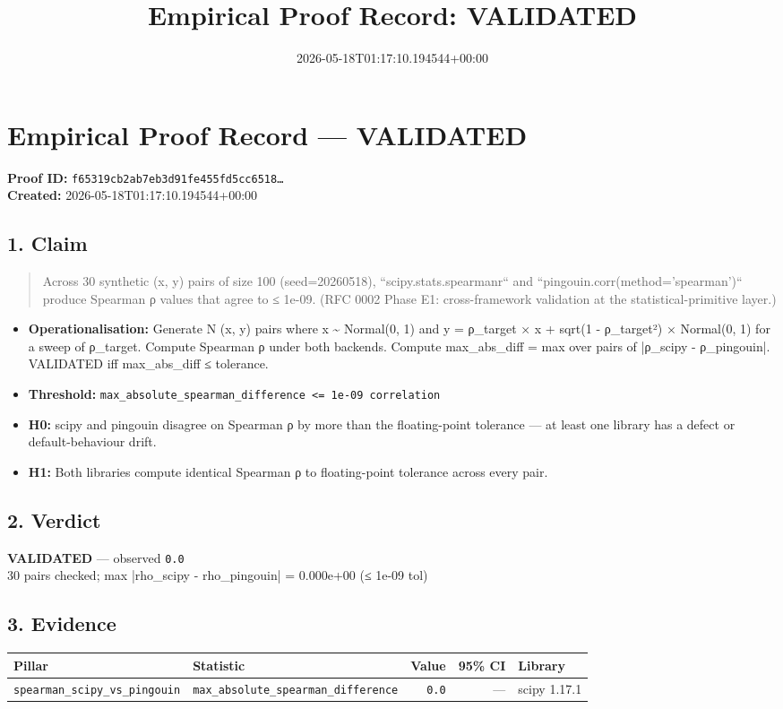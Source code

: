 \documentclass{article}
\title{Empirical Proof Record: VALIDATED}
\date{2026-05-18T01:17:10.194544+00:00}
\begin{document}
\maketitle
\section*{Empirical Proof Record --- \textcolor{validated}{\textbf{VALIDATED}}}
\textbf{Proof ID:} \texttt{f65319cb2ab7eb3d91fe455fd5cc6518\dots}\\
\textbf{Created:} 2026-05-18T01:17:10.194544+00:00
\subsection*{1. Claim}
\begin{quote}Across 30 synthetic (x, y) pairs of size 100 (seed=20260518), ``scipy.stats.spearmanr`` and ``pingouin.corr(method='spearman')`` produce Spearman ρ values that agree to ≤ 1e-09. (RFC 0002 Phase E1: cross-framework validation at the statistical-primitive layer.)\end{quote}
\begin{itemize}
\item \textbf{Operationalisation:} Generate N (x, y) pairs where x \textasciitilde{} Normal(0, 1) and y = ρ\_target × x + sqrt(1 - ρ\_target²) × Normal(0, 1) for a sweep of ρ\_target. Compute Spearman ρ under both backends. Compute max\_abs\_diff = max over pairs of |ρ\_scipy - ρ\_pingouin|. VALIDATED iff max\_abs\_diff ≤ tolerance.
\item \textbf{Threshold:} \texttt{max\_absolute\_spearman\_difference <= 1e-09 correlation}
\item \textbf{H0:} scipy and pingouin disagree on Spearman ρ by more than the floating-point tolerance — at least one library has a defect or default-behaviour drift.
\item \textbf{H1:} Both libraries compute identical Spearman ρ to floating-point tolerance across every pair.
\end{itemize}
\subsection*{2. Verdict}
\textcolor{validated}{\textbf{VALIDATED}} --- observed \texttt{0.0}\\
30 pairs checked; max |rho\_scipy - rho\_pingouin| = 0.000e+00 (≤ 1e-09 tol)
\subsection*{3. Evidence}
\begin{tabular}{llrrl}\toprule
\textbf{Pillar} & \textbf{Statistic} & \textbf{Value} & \textbf{95\% CI} & \textbf{Library} \\\midrule
\texttt{spearman\_scipy\_vs\_pingouin} & \texttt{max\_absolute\_spearman\_difference} & \texttt{0.0} & --- & scipy 1.17.1 \\
\bottomrule\end{tabular}
\end{document}
